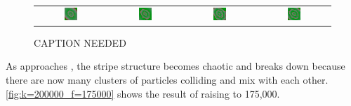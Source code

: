 \begin{figure}[h]
\begin{tabular}{c c c c}
\includegraphics[width = 0.2\textwidth]{../images/predator_prey_11_by_11_f_1.4_k_2_i4.png} & \includegraphics[width = 0.2\textwidth]{../images/../images/predator_prey_11_by_11_f_1.4_k_2_i5.png} & \includegraphics[width = 0.2\textwidth]{../images/../images/predator_prey_11_by_11_f_1.4_k_2_i6.png} & \includegraphics[width = 0.2\textwidth]{../images/../images/predator_prey_11_by_11_f_1.4_k_2_i7.png}
\end{tabular}
\caption{CAPTION NEEDED}
\label{fig:k=200000_f=140000}
\end{figure}

As  approaches , the stripe structure becomes chaotic and breaks down because there are now many clusters of  particles colliding and mix with each other. \autoref{fig:k=200000_f=175000} shows the result of raising  to 175,000.\\


